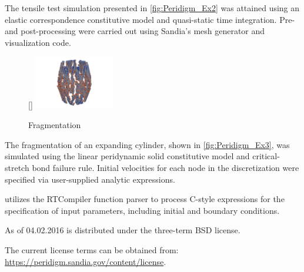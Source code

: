 The tensile test simulation presented in \autoref{fig:Peridigm_Ex2} was attained using an elastic correspondence constitutive model and quasi-static time integration. Pre- and post-processing were carried out using Sandia's  mesh generator and  visualization code.


\begin{figure}
\centering
\raisebox{0pt}[\dimexpr{}\baselineskip\relax]{
\includegraphics[width=3.5cm]{Figures/Peridigm_slide-image-3}
}
\caption{Fragmentation}
\label{fig:Peridigm_Ex3}
\end{figure}

The fragmentation of an expanding cylinder, shown in \autoref{fig:Peridigm_Ex3}, was simulated using the linear peridynamic solid constitutive model and critical-stretch bond failure rule. Initial velocities for each node in the discretization were specified via user-supplied analytic expressions.

\toolnameformatted utilizes the RTCompiler function parser to process C-style expressions for the specification of input parameters, including initial and boundary conditions.


As of 04.02.2016 \marktool[\tooladdress]{\toolnameshort} is distributed under the three-term BSD license.

The current license terms can be obtained from:\\ \url{https://peridigm.sandia.gov/content/license}.


